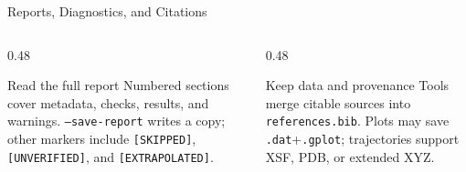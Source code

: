 \documentclass[8pt]{beamer}
\begin{document}
\begin{frame}{Reports, Diagnostics, and Citations}
	\centering
	\vspace{0.35cm}
	\begin{columns}[T]
		\begin{column}{0.48\textwidth}
			\begin{block}{Read the full report}
				Numbered sections cover metadata, checks, results, and
				warnings. \texttt{--save-report} writes a copy; other
				markers include \texttt{[SKIPPED]}, \texttt{[UNVERIFIED]},
				and \texttt{[EXTRAPOLATED]}.
			\end{block}
		\end{column}
		\begin{column}{0.48\textwidth}
			\begin{block}{Keep data and provenance}
				Tools merge citable sources into \texttt{references.bib}.
				Plots may save \texttt{.dat}+\texttt{.gplot}; trajectories
				support XSF, PDB, or extended XYZ.
			\end{block}
		\end{column}
	\end{columns}
\end{frame}
\end{document}

